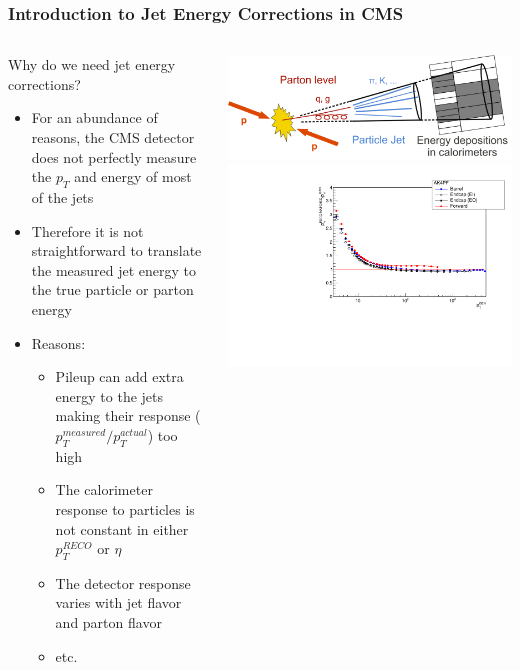 \begin{frame}
	\frametitle{Introduction to Jet Energy Corrections in CMS}
	\vspace*{-0.35cm}
	\begin{columns}
		\begin{column}{0.49\textwidth}
			\begin{block}{Why do we need jet energy corrections?}
					\begin{itemize}
						\item For an abundance of reasons, the CMS detector does not perfectly measure the $p_{T}$ and energy of most of the jets
						\item Therefore it is not straightforward to translate the measured jet energy to the true particle or parton energy
						\item Reasons:
						\begin{itemize}
							\item Pileup can add extra energy to the jets making their {\color{RedOrange} response} ($p_{T}^{measured}/p_{T}^{actual}$) too high
							\item The calorimeter response to particles is not constant in either $p_{T}^{RECO}$ or $\eta$
							\item The detector response varies with jet flavor and parton flavor
							\item etc.
						\end{itemize}
					\end{itemize}
				\end{block}
		\end{column}
		\begin{column}{0.49\textwidth}
			\includegraphics[width=\textwidth]{images/jetsatcmsand.png}\\
			\vspace*{0.2cm}
			\includegraphics[width=\textwidth]{images/response.pdf}

\end{column}
\end{columns}
\end{frame}
